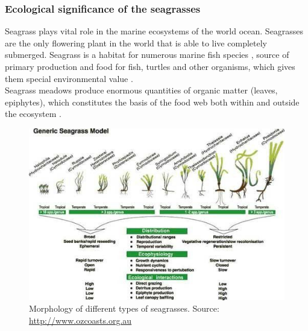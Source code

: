 \documentclass[10pt, a4paper]{article}
\begin{document}
\subsubsection{Ecological significance of the seagrasses}
Seagrass plays vital role in the marine ecosystems of the world ocean. Seagrasses are the only
flowering plant in the world that is able to live completely submerged. Seagrass is a habitat for
numerous marine fish species \cite{Nagelkerken00}\label{Nagelkerken00}, source of primary production and food for
fish, turtles and other organisms, which gives them special environmental value \cite{Noralez10}\label{Noralez10}.\\
Seagrass meadows produce enormous quantities of organic matter (leaves, epiphytes), which
constitutes the basis of the food web both within and outside the ecosystem \cite{Gobert06}\label{Gobert06}.

\begin{figure}
\centering
	\includegraphics[scale=0.25]{Fig-1-3.jpg}
	\caption{Morphology of different types of seagrasses.
	\label{fig:3}
Source: \url{http://www.ozcoasts.org.au}}
\end{figure}
\end{document}

